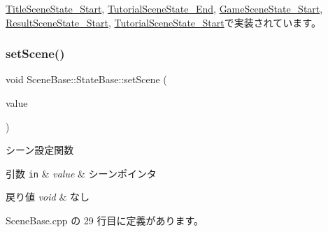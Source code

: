 \mbox{\hyperlink{class_title_scene_state___start_af4dfe902a4391ca8f0cff5d1aa9507f8}{Title\+Scene\+State\+\_\+\+Start}}, \mbox{\hyperlink{class_tutorial_scene_state___end_ada1a87235a021b40f8eca96e31879227}{Tutorial\+Scene\+State\+\_\+\+End}}, \mbox{\hyperlink{class_game_scene_state___start_a59270f7b65613f580864ed8ea3056179}{Game\+Scene\+State\+\_\+\+Start}}, \mbox{\hyperlink{class_result_scene_state___start_a8f776a7b2d31451c434fb74ffdd65960}{Result\+Scene\+State\+\_\+\+Start}}, \mbox{\hyperlink{class_tutorial_scene_state___start_a40bfdf7acd93b619138bf708adff31e4}{Tutorial\+Scene\+State\+\_\+\+Start}}で実装されています。

\mbox{\label{class_scene_base_1_1_state_base_adfb19da59b938832387aa10528bedb44}} 
\subsubsection{\texorpdfstring{set\+Scene()}{setScene()}}
{\footnotesize\ttfamily void Scene\+Base\+::\+State\+Base\+::set\+Scene (\begin{DoxyParamCaption}\item[{\mbox{\hyperlink{class_scene_base}{Scene\+Base}} $\ast$}]{value }\end{DoxyParamCaption})}



シーン設定関数 


\begin{DoxyParams}[1]{引数}
\mbox{\tt in}  & {\em value} & シーンポインタ \\
\hline
\end{DoxyParams}

\begin{DoxyRetVals}{戻り値}
{\em void} & なし \\
\hline
\end{DoxyRetVals}


 Scene\+Base.\+cpp の 29 行目に定義があります。

\mbox{\label{class_scene_base_1_1_state_base_a2763fa37e45b39bd8d3bbb735c76c59b}} 
